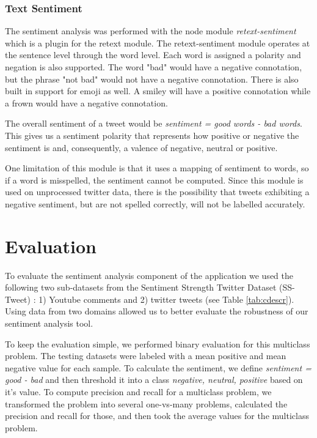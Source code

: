 \subsubsection{Text Sentiment}
The sentiment analysis was performed with the node module {\em retext-sentiment} which is a plugin for the retext module. The retext-sentiment module operates at the sentence level through the word level. Each word is assigned a polarity and negation is also supported. The word "bad" would have a negative connotation, but the phrase "not bad" would not have a negative connotation. There is also built in support for emoji as well. A smiley will have a positive connotation while a frown would have a negative connotation. 

The overall sentiment of a tweet would be {\em sentiment = good words - bad words}. This gives us a sentiment polarity that represents how positive or negative the sentiment is and, consequently, a valence of negative, neutral or positive.

One limitation of this module is that it uses a mapping of sentiment to words, so if a word is misspelled, the sentiment cannot be computed. Since this module is used on unprocessed twitter data, there is the possibility that tweets exhibiting a negative sentiment, but are not spelled correctly, will not be labelled accurately.

\section{Evaluation}
To evaluate the sentiment analysis component of the application we used the following two sub-datasets from the Sentiment Strength Twitter Dataset (SS-Tweet) \cite{saif2013evaluation}: 1) Youtube comments and 2) twitter tweets (see Table \ref{tab:cdescr}). Using data from two domains allowed us to better evaluate the robustness of our sentiment analysis tool. 

To keep the evaluation simple, we performed binary evaluation for this multiclass problem. 
The testing datasets were labeled with a mean positive and mean negative value for each sample. To calculate the sentiment, we define {\em sentiment = good - bad} and then threshold it into a class {\em negative, neutral, positive} based on it's value.
To compute precision and recall for a multiclass problem, we transformed the problem into several one-vs-many problems, calculated the precision and recall for those, and then took the average values for the multiclass problem.

